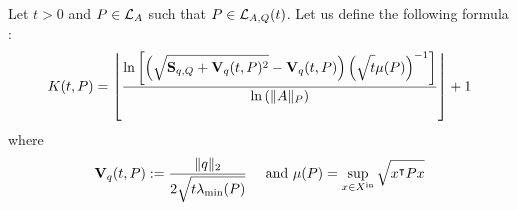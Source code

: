 \documentclass[10pt]{article}
\begin{document}
\begin{comment}
Let $t>0$ and $P\in\lyat{A,Q}$. Let us define the following formula :
\begin{equation}
\label{kappat}
\kappa_t(P)=  \dfrac{\ln\left(\mu_{\xin}(Q)\mu_{\xin}(P)^{-1}t^{-1}\right)}{\ln\left(\norm{A}_P^2\right)}
\end{equation}

Let $P\in\lyap{A}$. We define the following formula :
\begin{equation}
\label{kappainf}
\kappa_\infty(P)= \dfrac{\ln\left(\mu_{\xin}(Q)\mu_{\xin}(P)^{-1}\lambda_d(P)\lambda_1(Q)^{-1}\right)}{\ln\left(\norm{A}_P^2\right)}
\end{equation}
\end{comment}

Let $t>0$ and $P\in\mathcal{L}_{A}$ such that $P\in \mathcal{L}_{A,Q}(t)$. Let us define the following formula :
\begin{equation}
\label{intgfond}
K(t,P)=\left\lfloor \dfrac{\ln\left[\left(\sqrt{\strut \mathbf{S}_{q,Q}+\mathbf{V}_{q}(t,P)^2}-\mathbf{V}_{q}(t,P)\right)\left(\sqrt{\strut t}\mu(P)\right)^{-1}\right]}{\ln\left(\| A\|_P\right)}\right\rfloor+1
\end{equation}
where 
\[
\mathbf{V}_{q}(t,P):=\dfrac{\| q\|_2 }{2\sqrt{\strut t\lambda_{\operatorname{min}}(P)}}\quad \text{ and } \mu(P)=\sup_{x\in X^\mathrm{in}} \sqrt{\strut x^\intercal P x}
\]
\end{document}
